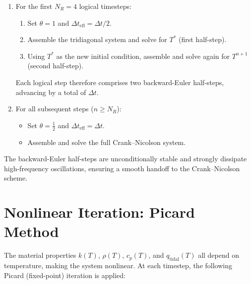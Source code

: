 \documentclass[11pt,a4paper]{article}
\newcommand{\half}{\tfrac{1}{2}}
\begin{document}
\begin{enumerate}[leftmargin=2em]
\item For the first $N_R = 4$ logical timesteps:
  \begin{enumerate}
  \item Set $\theta = 1$ and $\Delta t_{\mathrm{eff}} = \Delta t / 2$.
  \item Assemble the tridiagonal system and solve for $T^*$ (first half-step).
  \item Using $T^*$ as the new initial condition, assemble and solve again
        for $T^{n+1}$ (second half-step).
  \end{enumerate}
  Each logical step therefore comprises two backward-Euler half-steps,
  advancing by a total of $\Delta t$.

\item For all subsequent steps ($n \geq N_R$):
  \begin{itemize}
  \item Set $\theta = \half$ and $\Delta t_{\mathrm{eff}} = \Delta t$.
  \item Assemble and solve the full Crank--Nicolson system.
  \end{itemize}
\end{enumerate}

The backward-Euler half-steps are unconditionally stable and strongly
dissipate high-frequency oscillations, ensuring a smooth handoff to the
Crank--Nicolson scheme.

\section{Nonlinear Iteration: Picard Method}
\label{sec:picard}

The material properties $k(T)$, $\rho(T)$, $c_p(T)$, and
$q_{\mathrm{tidal}}(T)$ all depend on temperature, making the system
nonlinear. At each timestep, the following Picard (fixed-point)
iteration is applied:
\end{document}

